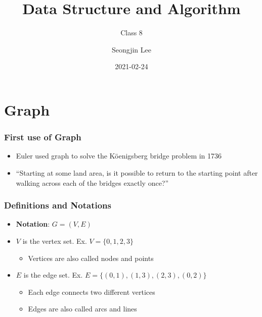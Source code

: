 \documentclass[newPxFont,sthlmFooter,nooffset]{beamer}
\title{Data Structure and Algorithm}
\subtitle{Class 8}
\author[SJL]{Seongjin Lee}
\institute{\href{mailto:insight@gnu.ac.kr}{insight@gnu.ac.kr}\\\url{http://resourceful.github.io}\\Systems Research Lab.\\GNU}
\date{2021-02-24}
\begin{document}
\frame[plain,t]{\titlepage} 



\section{Graph}
\begin{frame}[t]
  \frametitle{First use of Graph}
  \begin{itemize}
  \item Euler used graph to solve the K\"oenigsberg bridge problem in 1736
  \item ``Starting at some land area, is it possible to return to the starting point after walking across each of the bridges exactly once?''
  \end{itemize}
\begin{center}
\end{center}
\end{frame}


\begin{frame}[t]
  \frametitle{Definitions and Notations}
  \begin{itemize}
  \item \textbf{Notation}: $G=(V,E)$
  \item $V$ is the vertex set. Ex. $V= \{0, 1, 2 ,3\}$
    \begin{itemize}
    \item Vertices are also called nodes and points
    \end{itemize}

  \item $E$ is the edge set. Ex. $E= \{(0,1), (1,3), (2,3), (0, 2)\}$
    \begin{itemize}
    \item Each edge connects two different vertices
    \item Edges are also called arcs and lines
    \end{itemize}

  \end{itemize}


\end{frame}
\end{document}
